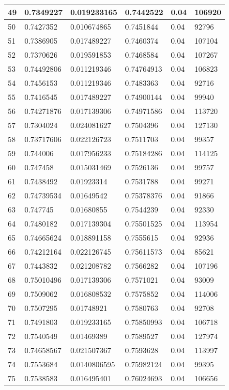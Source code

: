 \begin{longtable}{|l|l|l|l|l|l|}
49 & 0.7349227 & 0.019233165 & 0.7442522 & 0.04 & 106920 \\ \hline 
50 & 0.7427352 & 0.010674865 & 0.7451844 & 0.04 & 92796 \\ \hline 
51 & 0.7386905 & 0.017489227 & 0.7460374 & 0.04 & 107104 \\ \hline 
52 & 0.7370626 & 0.019591853 & 0.7468584 & 0.04 & 107267 \\ \hline 
53 & 0.74492806 & 0.011219346 & 0.74764913 & 0.04 & 106823 \\ \hline 
54 & 0.7456153 & 0.011219346 & 0.7483363 & 0.04 & 92716 \\ \hline 
55 & 0.7416545 & 0.017489227 & 0.74900144 & 0.04 & 99940 \\ \hline 
56 & 0.74271876 & 0.017139306 & 0.74971586 & 0.04 & 113720 \\ \hline 
57 & 0.7304024 & 0.024081627 & 0.7504396 & 0.04 & 127130 \\ \hline 
58 & 0.73717606 & 0.022126723 & 0.7511703 & 0.04 & 99357 \\ \hline 
59 & 0.744006 & 0.017956233 & 0.75184286 & 0.04 & 114125 \\ \hline 
60 & 0.747458 & 0.015031469 & 0.7526136 & 0.04 & 99757 \\ \hline 
61 & 0.7438492 & 0.01923314 & 0.7531788 & 0.04 & 99271 \\ \hline 
62 & 0.74739534 & 0.01649542 & 0.75378376 & 0.04 & 91866 \\ \hline 
63 & 0.747745 & 0.01680855 & 0.7544239 & 0.04 & 92330 \\ \hline 
64 & 0.7480182 & 0.017139304 & 0.75501525 & 0.04 & 113954 \\ \hline 
65 & 0.74665624 & 0.018891158 & 0.7555615 & 0.04 & 92936 \\ \hline 
66 & 0.74212164 & 0.022126745 & 0.75611573 & 0.04 & 85621 \\ \hline 
67 & 0.7443832 & 0.021208782 & 0.7566282 & 0.04 & 107196 \\ \hline 
68 & 0.75010496 & 0.017139306 & 0.7571021 & 0.04 & 93009 \\ \hline 
69 & 0.7509062 & 0.016808532 & 0.7575852 & 0.04 & 114006 \\ \hline 
70 & 0.7507295 & 0.01748921 & 0.7580763 & 0.04 & 92708 \\ \hline 
71 & 0.7491803 & 0.019233165 & 0.75850993 & 0.04 & 106718 \\ \hline 
72 & 0.7540549 & 0.01469389 & 0.7589527 & 0.04 & 127974 \\ \hline 
73 & 0.74658567 & 0.021507367 & 0.7593628 & 0.04 & 113997 \\ \hline 
74 & 0.7553684 & 0.0140806595 & 0.75982124 & 0.04 & 99395 \\ \hline 
75 & 0.7538583 & 0.016495401 & 0.76024693 & 0.04 & 106656 \\ \hline 
\end{longtable}